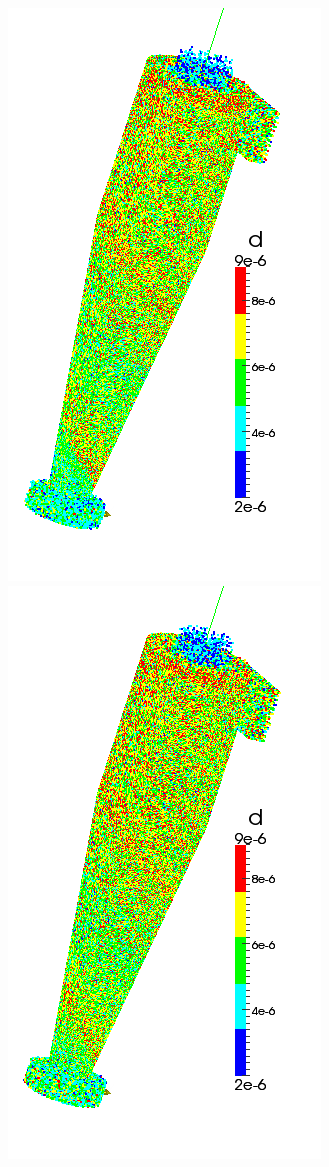 \begin{figure}[h]
\begin{minipage}{0.2\linewidth}
	\end{minipage}
		\hspace{-1em}
	\begin{minipage}{0.2\linewidth}
		\includegraphics[scale=0.3]{t6}
	\end{minipage}
		\hspace{-1em}
	\begin{minipage}{0.2\linewidth}
		\includegraphics[scale=0.3]{t7}

\end{minipage}
\end{figure}
